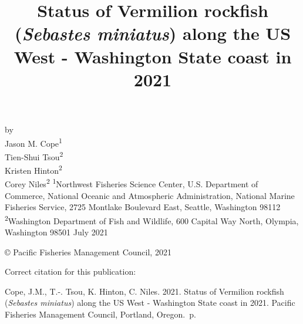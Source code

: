 \documentclass[11pt,
  english,
  a4paper,
]{article}
\date{}
\newcommand{\trTitle}{Status of Vermilion rockfish (\emph{Sebastes miniatus}) along the US West - Washington State coast in 2021}
\newcommand{\trYear}{2021}
\newcommand{\trMonth}{July}
\newcommand{\trAuthsBack}{Cope, J.M., T.-. Tsou, K. Hinton, C. Niles}
\newcommand{\trCitation}{
\begin{hangparas}{1em}{1}
\trAuthsBack{}. \trYear{}. \trTitle{}. Pacific Fisheries Management Council, Portland, Oregon. \pageref{LastPage}{}\,p.
\end{hangparas}}
\begin{document}

\renewcommand*{\thefootnote}{\fnsymbol{footnote}}

\small
\thispagestyle{empty}
\noindent
\begin{center}
\title{Status of Vermilion rockfish (\emph{Sebastes miniatus}) along the US West - Washington State coast in 2021}
\vspace{1.5cm}
{\Large\textbf{}}
\vfill
by\\
Jason M. Cope\textsuperscript{1}\\
Tien-Shui Tsou\textsuperscript{2}\\
Kristen Hinton\textsuperscript{2}\\
Corey Niles\textsuperscript{2}\vfill
\textsuperscript{1}Northwest Fisheries Science Center, U.S. Department of Commerce, National Oceanic and Atmospheric Administration, National Marine Fisheries Service, 2725 Montlake Boulevard East, Seattle, Washington 98112\\
\textsuperscript{2}Washington Department of Fish and Wildlife, 600 Capital Way North, Olympia, Washington 98501\vfill
\trMonth{} \trYear{}
\end{center}
\clearpage

\thispagestyle{empty}
\vspace*{\fill}
\begin{center}
\copyright{} Pacific Fisheries Management Council, \trYear{}\\
\end{center}
\par
\bigskip
\noindent
Correct citation for this publication:
\bigskip
\par
\trCitation{}
\clearpage


\tableofcontents\clearpage
\label{TRlastRoman}
\clearpage

\newpage
\thispagestyle{empty} %

\pagestyle{plain}  %
\renewcommand*{\thefootnote}{\arabic{footnote}}  %
\setcounter{footnote}{0}  %
\renewcommand{\headrulewidth}{0.5pt}
\renewcommand{\footrulewidth}{0.5pt}
\end{document}
